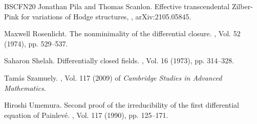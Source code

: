 \documentclass[12pt]{amsart}
\theoremstyle{definition}
\theoremstyle{plain}
\theoremstyle{exampstyle}
\theoremstyle{exampstyle}\newtheorem{thmxbis}{Theorem}
\numberwithin{equation}{section}
\theoremstyle{remark}
\begin{document}
\begin{thebibliography}{BSCFN20}
Jonathan Pila and Thomas Scanlon.
\newblock Effective transcendental Zilber-Pink for variations of Hodge
  structures,
, arXiv:2105.05845.


Maxwell Rosenlicht.
\newblock The nonminimality of the differential closure.
, Vol. 52 (1974), pp. 529--537.

Saharon Shelah.
\newblock Differentially closed fields.
, Vol. 16 (1973), pp. 314--328.

Tam\'{a}s Szamuely.
, Vol. 117 (2009) of {\em
  Cambridge Studies in Advanced Mathematics}.

Hiroshi Umemura.
\newblock Second proof of the irreducibility of the first differential equation
  of {P}ainlev\'{e}.
, Vol. 117 (1990), pp. 125--171.

\end{thebibliography}

%
%
\end{document}
